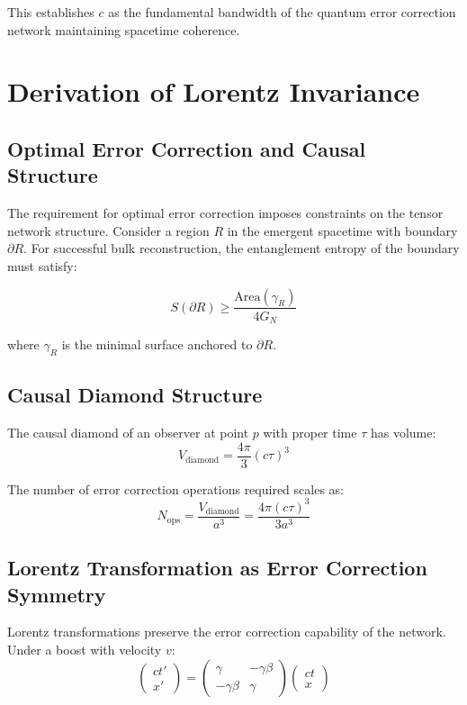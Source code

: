 \documentclass[12pt]{article}
\begin{document}
This establishes $c$ as the fundamental bandwidth of the quantum error correction network maintaining spacetime coherence.

\section{Derivation of Lorentz Invariance}

\subsection{Optimal Error Correction and Causal Structure}

The requirement for optimal error correction imposes constraints on the tensor network structure. Consider a region $R$ in the emergent spacetime with boundary $\partial R$. For successful bulk reconstruction, the entanglement entropy of the boundary must satisfy:

\begin{equation}
S(\partial R) \geq \frac{\text{Area}(\gamma_R)}{4G_N}
\end{equation}

where $\gamma_R$ is the minimal surface anchored to $\partial R$.

\subsection{Causal Diamond Structure}

The causal diamond of an observer at point $p$ with proper time $\tau$ has volume:
\begin{equation}
V_{\text{diamond}} = \frac{4\pi}{3} (c\tau)^3
\end{equation}

The number of error correction operations required scales as:
\begin{equation}
N_{\text{ops}} = \frac{V_{\text{diamond}}}{a^3} = \frac{4\pi (c\tau)^3}{3a^3}
\end{equation}

\subsection{Lorentz Transformation as Error Correction Symmetry}

Lorentz transformations preserve the error correction capability of the network. Under a boost with velocity $v$:
\begin{equation}
\begin{pmatrix}
ct' \\ x'
\end{pmatrix} = \begin{pmatrix}
\gamma & -\gamma\beta \\
-\gamma\beta & \gamma
\end{pmatrix}
\begin{pmatrix}
ct \\ x
\end{pmatrix}
\end{equation}
\end{document}

